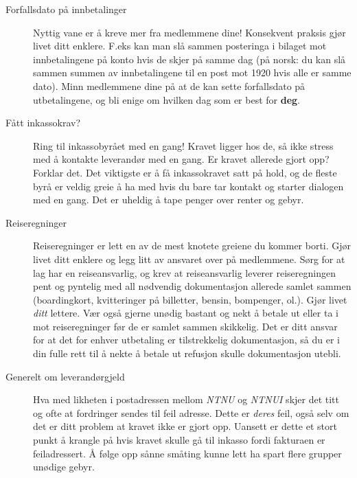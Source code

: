\begin{description}
\item [Forfallsdato på innbetalinger] Nyttig vane er å kreve mer fra medlemmene dine! Konsekvent praksis gjør livet ditt enklere. F.eks kan man slå sammen posteringa i bilaget mot innbetalingene på konto hvis de skjer på samme dag (på norsk: du kan slå sammen summen av innbetalingene til en post mot 1920 hvis alle er samme dato).
Minn medlemmene dine på at de kan sette forfallsdato på utbetalingene, og bli enige om hvilken dag som er best for {\bfseries deg}.

\item[Fått inkassokrav?] Ring til inkassobyrået med en gang! Kravet ligger hos de, så ikke stress med å kontakte leverandør med en gang. Er kravet allerede gjort opp? Forklar det.
Det viktigste er å få inkassokravet satt på hold, og de fleste byrå er veldig greie å ha med hvis du bare tar kontakt og starter dialogen med en gang.
Det er uheldig å tape penger over renter og gebyr.

\item[Reiseregninger] Reiseregninger er lett en av de mest knotete greiene du kommer borti. Gjør livet ditt enklere og legg litt av ansvaret over på medlemmene. Sørg for at lag har en reiseansvarlig, og krev at reiseansvarlig leverer reiseregningen pent og pyntelig med all nødvendig dokumentasjon allerede samlet sammen (boardingkort, kvitteringer på billetter, bensin, bompenger, ol.). Gjør livet \emph{ditt} lettere.
Vær også gjerne unødig bastant og nekt å betale ut eller ta i mot reiseregninger før de er samlet sammen skikkelig.
Det er ditt ansvar for at det for enhver utbetaling er tilstrekkelig dokumentasjon, så du er i din fulle rett til å nekte å betale ut refusjon skulle dokumentasjon utebli.

\item[Generelt om leverandørgjeld] Hva med likheten i postadressen mellom \emph{NTNU} og \emph{NTNUI} skjer det titt og ofte at fordringer sendes til feil adresse. Dette er \emph{deres} feil, også selv om det er ditt problem at kravet ikke er gjort opp. Uansett er dette et stort punkt å krangle på hvis kravet skulle gå til inkasso fordi fakturaen er feiladressert. Å følge opp sånne småting kunne lett ha spart flere grupper unødige gebyr.
\end{description}
